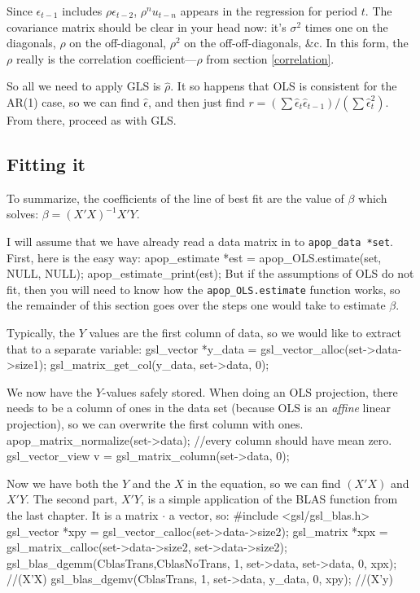 Since $\epsilon_{t-1}$ includes $\rho\epsilon_{t-2}$, $\rho^n u_{t-n}$
appears in the regression for period $t$. The covariance matrix should
be clear in your head now: it's $\sigma^2$ times one on the diagonals,
$\rho$ on the off-diagonal, $\rho^2$ on the off-off-diagonals, \&c. In
this form, the $\rho$ really is the correlation coefficient---$\rho$
from section \ref{correlation}.

So all we need to apply GLS is $\hat\rho$. It so happens that OLS is
consistent for the AR(1) case, so we can find $\hat\epsilon$, and then
just find $r=(\sum \hat\epsilon_t \hat\epsilon_{t-1})/(\sum
\hat\epsilon_t^2)$. From there, proceed as with GLS.



\subsection{Fitting it} 
To summarize,
the coefficients of  the line of best fit are the value of $\beta$ which solves:
$ \beta = (X'X)^{-1}X'Y$.

I will assume that we have already read a data matrix in to {\tt apop\_data *set}. First, here is the easy way:
apop_estimate *est = apop_OLS.estimate(set, NULL, NULL);
apop_estimate_print(est);
But if the assumptions of OLS do not fit, then you will need to know how
the {\tt apop\_\-OLS.est\-i\-mate} function works, so the remainder of this
section goes over the steps one would take to estimate $\beta$.  

 Typically, the $Y$
values are the first column of data, so we would like to extract that to a separate variable:
gsl_vector      *y_data         = gsl_vector_alloc(set->data->size1);
gsl_matrix_get_col(y_data, set->data, 0);


We now have the $Y$-values safely stored.  When doing an OLS projection,
there needs to be a column of ones in the data set (because OLS is an
{\sl affine} linear projection), so we can overwrite the first column
with ones. 
        apop_matrix_normalize(set->data);            //every column should have mean zero.
gsl_vector_view v         = gsl_matrix_column(set->data, 0);


Now we have both the $Y$ and the $X$ in the equation, so we can find $(X'X)$ and $X'Y$.
The second part, $X'Y$, is a simple application of the BLAS function from the last chapter. It is a
matrix $\cdot$ a vector, so:
#include <gsl/gsl_blas.h>
gsl_vector      *xpy            = gsl_vector_calloc(set->data->size2);
gsl_matrix      *xpx            = gsl_matrix_calloc(set->data->size2, set->data->size2);
        gsl_blas_dgemm(CblasTrans,CblasNoTrans, 1, set->data, set->data, 0, xpx); //(X'X)
        gsl_blas_dgemv(CblasTrans, 1, set->data, y_data, 0, xpy); //(X'y)

